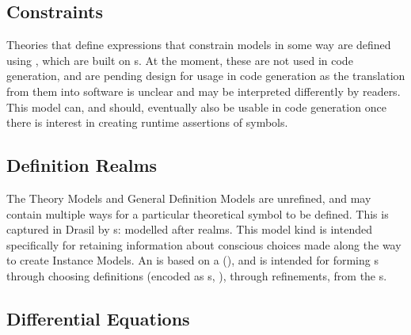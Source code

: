 
\subsection{Constraints}


Theories that define expressions that constrain models in some way are defined
using \EquationalConstraints{}, which are built on \ConstraintSet{}s.
At the moment, these are not used in code generation, and are pending design for
usage in code generation as the translation from them into software is unclear
and may be interpreted differently by readers. This model can, and should,
eventually also be usable in code generation once there is interest in creating
runtime assertions of symbols.


\subsection{Definition Realms}

\currentDefiningExprHaskell{}

\currentMultiDefnHaskell{}

The Theory Models and General Definition Models are unrefined, and may contain
multiple ways for a particular theoretical symbol to be defined. This is
captured in Drasil by \EquationalRealm{}s: modelled after realms. This model kind is
intended specifically for retaining information about conscious choices made
along the way to create Instance Models. An \EquationalRealm{} is based on a
\MultiDefn{} (), and is intended for forming
\QDefinition{}s through choosing definitions (encoded as \DefiningExpr{}s,
), through refinements, from the \MultiDefn{}s.


\subsection{Differential Equations}

